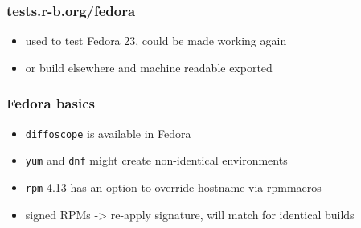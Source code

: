 \documentclass[14pt]{beamer}
\begin{document}
\begin{frame}
 \frametitle{tests.r-b.org/fedora}
 \begin{itemize}
  \item used to test Fedora 23, could be made working again
  \item or build elsewhere and machine readable exported
  \end{itemize}
\end{frame}

\begin{frame}
 \frametitle{Fedora basics}
 \begin{itemize}
  \item \texttt{diffoscope} is available in Fedora
  \item \texttt{yum} and \texttt{dnf} might create non-identical environments
  \item \texttt{rpm}-4.13 has an option to override hostname via rpmmacros
  \item signed RPMs -> re-apply signature, will match for identical builds
  \end{itemize}
\end{frame}
\end{document}
